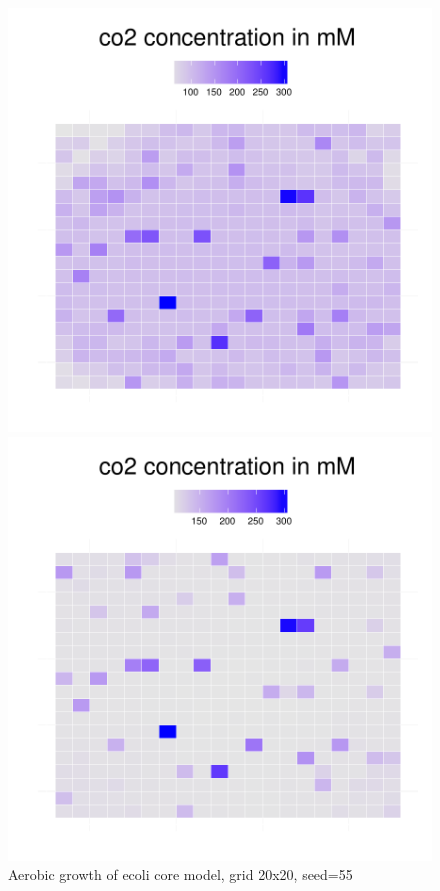 \begin{figure}[h]
{\begin{minipage}[t]{0.3\textwidth}
  \end{minipage}
  \begin{minipage}[t]{0.3\textwidth}
    \includegraphics[width=\textwidth]{../results/Bcoli_20x20_seed176_co235.pdf}
  \end{minipage}
  \begin{minipage}[t]{0.3\textwidth}
    \includegraphics[width=\textwidth]{../results/Bcoli_20x20_seed176_co250.pdf}
  \end{minipage}
  }
  \caption{Aerobic growth of ecoli core model, grid 20x20, seed=55}
\end{figure}

